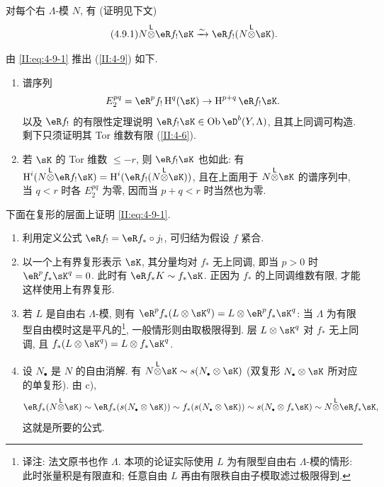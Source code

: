 对每个右 $\Lambda$-模 $N$, 有 (证明见下文)
\begin{equation*}\tag{4.9.1}\label{II:eq:4-9-1}
  N\lotimes \eR f_! \sK \iso \eR f_! (N\lotimes \sK) \text{.}
\end{equation*}

由 \eqref{II:eq:4-9-1} 推出 (\ref{II:4-9}) 如下.
\begin{enumerate}[\indent a)]
  \item 谱序列
    \[
      E_2^{p q} = \eR^p f_! \h^q(\sK) \rightarrow \h^{p+q} \eR f_! \sK \text{.}
    \]
    以及 $\eR f_!$ 的有限性定理说明 $\eR f_!\sK\in \ob \eD^b(Y,\Lambda)$, 且其上同调可构造. 剩下只须证明其 Tor 维数有限 (\ref{II:4-6}).
  \item 若 $\sK$ 的 Tor 维数 $\leqslant -r$, 则 $\eR f_! \sK$ 也如此: 有 $\h^i(N\lotimes \eR f_! \sK) = \h^i(\eR f_!(N\lotimes \sK))$, 且在上面用于 $N\lotimes \sK$ 的谱序列中, 当 $q<r$ 时各 $E_2^{p q}$ 为零, 因而当 $p+q<r$ 时当然也为零.
\end{enumerate}

下面在复形的层面上证明 \eqref{II:eq:4-9-1}.
\begin{enumerate}[\indent a)]
  \item 利用定义公式 $\eR f_! = \eR f_*\circ j_!$, 可归结为假设 $f$ 紧合.
  \item 以一个上有界复形表示 $\sK$, 其分量均对 $f_*$ 无上同调, 即当 $p>0$ 时 $\eR^p f_* \sK^q = 0$. 此时有 $\eR f_* K \sim f_* \sK$. 正因为 $f_*$ 的上同调维数有限, 才能这样使用上有界复形.
  \item 若 $L$ 是自由右 $\Lambda$-模, 则有 $\eR^p f_*(L\otimes \sK^q) = L\otimes \eR^p f_* \sK^q$: 当 $\Lambda$ 为有限型自由模时这是平凡的\footnote{译注: 法文原书也作 $\Lambda$. 本项的论证实际使用 $L$ 为有限型自由右 $\Lambda$-模的情形: 此时张量积是有限直和; 任意自由 $L$ 再由有限秩自由子模取滤过极限得到.}, 一般情形则由取极限得到. 层 $L\otimes \sK^q$ 对 $f_*$ 无上同调, 且 $f_*(L\otimes \sK^q) = L\otimes f_* \sK^q$.
  \item 设 $N_\bullet$ 是 $N$ 的自由消解. 有 $N\lotimes \sK\sim s(N_\bullet\otimes \sK)$ (双复形 $N_\bullet\otimes \sK$ 所对应的单复形). 由 c),
    \[
      \eR f_*(N\lotimes \sK) \sim \eR f_* (s(N_\bullet\otimes \sK)) \sim f_*(s(N_\bullet\otimes \sK)) \sim s(N_\bullet\otimes f_* \sK) \sim N\lotimes \eR f_* \sK \text{,}
    \]
    这就是所要的公式.
\end{enumerate}

